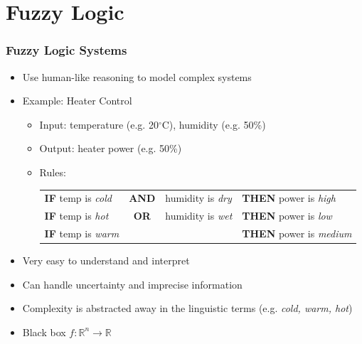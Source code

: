 \documentclass[
	10pt,
	t		%
]{beamer}
\begin{document}
\section{Fuzzy Logic}
\begin{frame}
	\frametitle{Fuzzy Logic Systems}

	\begin{itemize}
		\item Use human-like reasoning to model complex systems
		\item Example: Heater Control
		      \begin{itemize}
			      \item Input: temperature (e.g. 20$^{\circ}$C), humidity (e.g. 50\%)
			      \item Output: heater power (e.g. 50\%)
			      \item Rules:
			            \begin{tabular}{lcll}
				            \textbf{IF}  temp is \textit{cold} & \textbf{AND} & humidity is \textit{dry} & \textbf{THEN}  power is \textit{high}   \\
				            \textbf{IF}  temp is \textit{hot}  & \textbf{OR}  & humidity is \textit{wet} & \textbf{THEN}  power is \textit{low}    \\
				            \textbf{IF}  temp is \textit{warm} &              &                          & \textbf{THEN}  power is \textit{medium} \\
			            \end{tabular}
		      \end{itemize}
		\item Very easy to understand and interpret
		\item Can handle uncertainty and imprecise information
		\item Complexity is abstracted away in the linguistic terms (e.g. \textit{cold, warm, hot})
		\item Black box  $f: \mathbb{R}^n \rightarrow \mathbb{R}$
	\end{itemize}

\end{frame}
\end{document}
